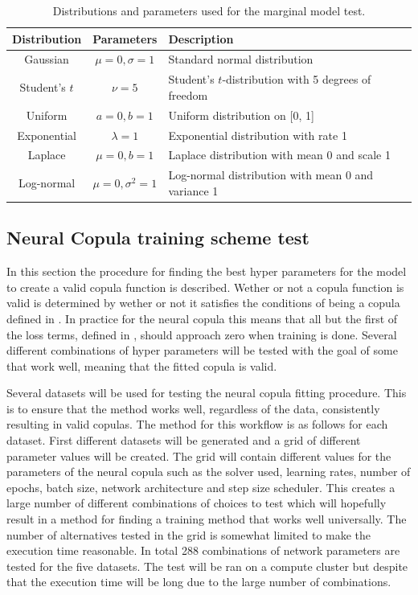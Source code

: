 \begin{table}[h]
    \centering
    \caption{Distributions and parameters used for the marginal model test.}
    \begin{tabular}{@{}ccl@{}}
        Distribution & Parameters & Description \\
        \toprule
        Gaussian & $\mu=0, \sigma=1$ & Standard normal distribution \\ 
        Student's $t$ & $\nu=5$ & Student's $t$-distribution with 5 degrees of freedom \\ 
        Uniform & $a=0, b=1$ & Uniform distribution on [0, 1] \\ 
        Exponential & $\lambda=1$ & Exponential distribution with rate 1 \\ 
        Laplace & $\mu=0, b=1$ & Laplace distribution with mean 0 and scale 1 \\ 
        Log-normal & $\mu=0, \sigma^2=1$ & Log-normal distribution with mean 0 and variance 1 \\ 
    \end{tabular}
    \label{tab:distributions}
\end{table}



\subsection{Neural Copula training scheme test}
In this section the procedure for finding the best hyper parameters for the model to create a valid copula function is described. Wether or not a copula function is valid is determined by wether or not it satisfies the conditions of being a copula defined in . In practice for the neural copula this means that all but the first of the loss terms, defined in , should approach zero when training is done. Several different combinations of hyper parameters will be tested with the goal of some that work well, meaning that the fitted copula is valid.

Several datasets will be used for testing the neural copula fitting procedure. This is to ensure that the method works well, regardless of the data, consistently resulting in valid copulas. The method for this workflow is as follows for each dataset. First different datasets will be generated and a grid of different parameter values will be created. The grid will contain different values for the parameters of the neural copula such as the solver used, learning rates, number of epochs, batch size, network architecture and step size scheduler. This creates a large number of different combinations of choices to test which will hopefully result in a method for finding a training method that works well universally. The number of alternatives tested in the grid is somewhat limited to make the execution time reasonable. In total 288 combinations of network parameters are tested for the five datasets. The test will be ran on a compute cluster but despite that the execution time will be long due to the large number of combinations. 

